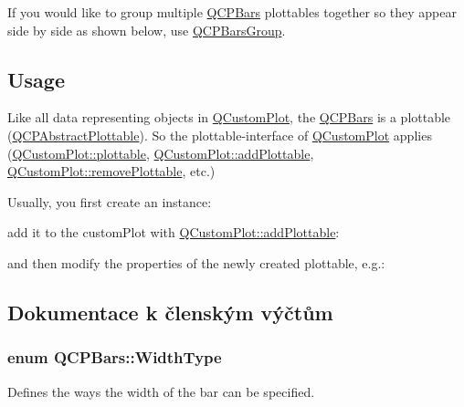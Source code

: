 If you would like to group multiple \hyperlink{classQCPBars}{Q\+C\+P\+Bars} plottables together so they appear side by side as shown below, use \hyperlink{classQCPBarsGroup}{Q\+C\+P\+Bars\+Group}.

\hypertarget{classQCPStatisticalBox_usage}{}\subsection{Usage}\label{classQCPStatisticalBox_usage}
Like all data representing objects in \hyperlink{classQCustomPlot}{Q\+Custom\+Plot}, the \hyperlink{classQCPBars}{Q\+C\+P\+Bars} is a plottable (\hyperlink{classQCPAbstractPlottable}{Q\+C\+P\+Abstract\+Plottable}). So the plottable-\/interface of \hyperlink{classQCustomPlot}{Q\+Custom\+Plot} applies (\hyperlink{classQCustomPlot_a32de81ff53e263e785b83b52ecd99d6f}{Q\+Custom\+Plot\+::plottable}, \hyperlink{classQCustomPlot_ab7ad9174f701f9c6f64e378df77927a6}{Q\+Custom\+Plot\+::add\+Plottable}, \hyperlink{classQCustomPlot_af3dafd56884208474f311d6226513ab2}{Q\+Custom\+Plot\+::remove\+Plottable}, etc.)

Usually, you first create an instance\+: 
\begin{DoxyCodeInclude}
\end{DoxyCodeInclude}
add it to the custom\+Plot with \hyperlink{classQCustomPlot_ab7ad9174f701f9c6f64e378df77927a6}{Q\+Custom\+Plot\+::add\+Plottable}\+: 
\begin{DoxyCodeInclude}
\end{DoxyCodeInclude}
and then modify the properties of the newly created plottable, e.\+g.\+: 
\begin{DoxyCodeInclude}
\end{DoxyCodeInclude}


\subsection{Dokumentace k členským výčtům}
\hypertarget{classQCPBars_a65dbbf1ab41cbe993d71521096ed4649}{}
\subsubsection[{Width\+Type}]{\setlength{\rightskip}{0pt plus 5cm}enum {\bf Q\+C\+P\+Bars\+::\+Width\+Type}}\label{classQCPBars_a65dbbf1ab41cbe993d71521096ed4649}


Defines the ways the width of the bar can be specified. 


